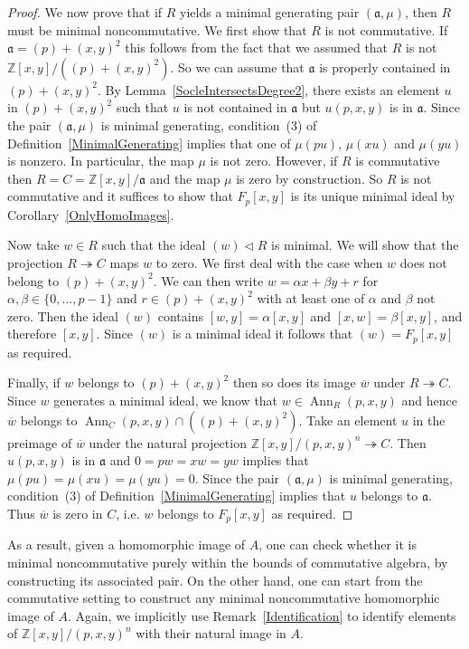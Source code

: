 \documentclass[11pt]{article}
\DeclareMathOperator{\Ann}{Ann}
\theoremstyle{definition}
\begin{document}
\begin{proof}
We now prove that if $R$ yields a minimal generating pair $(\mathfrak{a},\mu)$, then $R$ must be minimal noncommutative. We first show that $R$ is not commutative. If $\mathfrak{a}=(p)+(x,y)^2$ this follows from the fact that we assumed that $R$ is not $\mathbb{Z}[x,y]/\left((p)+(x,y)^2\right)$. So we can assume that $\mathfrak{a}$ is properly contained in $(p)+(x,y)^2$. By Lemma~\ref{SocleIntersectsDegree2}, there exists an element $u$ in $(p)+(x,y)^2$ such that $u$ is not contained in $\mathfrak{a}$ but $u(p,x,y)$ is in $\mathfrak{a}$. Since the pair $\left(\mathfrak{a},\mu\right)$ is minimal generating, condition~(3) of Definition~\ref{MinimalGenerating} implies that one of $\mu(pu)$, $\mu(xu)$ and $\mu(yu)$ is nonzero. In particular, the map $\mu$ is not zero. However, if $R$ is commutative then $R=C=\mathbb{Z}[x,y]/\mathfrak{a}$ and the map $\mu$ is zero by construction. So $R$ is not commutative and it suffices to show that $F_p[x,y]$ is its unique minimal ideal by Corollary~\ref{OnlyHomoImages}.

Now take $w\in R$ such that the ideal $(w)\lhd R$ is minimal. We will show that the projection $R \twoheadrightarrow C$ maps $w$ to zero. We first deal with the case when $w$ does not belong to $(p)+(x,y)^2$. We can then write $w=\alpha x+\beta y + r$ for $\alpha,\beta\in\lbrace 0,\ldots,p-1\rbrace$ and $r\in (p)+(x,y)^2$ with at least one of $\alpha$ and $\beta$ not zero. Then the ideal $(w)$ contains $[w,y]=\alpha[x,y]$ and $[x,w]=\beta[x,y]$, and therefore $[x,y]$. Since $(w)$ is a minimal ideal it follows that $(w)=F_p[x,y]$ as required.

Finally, if $w$ belongs to $(p)+(x,y)^2$ then so does its image $\overline{w}$ under $R\twoheadrightarrow C$. Since $w$ generates a minimal ideal, we know that $w\in\Ann_R(p,x,y)$ and hence $\overline{w}$ belongs to $\Ann_C(p,x,y)\cap\left((p)+(x,y)^2\right)$. Take an element $u$ in the preimage of $\overline{w}$ under the natural projection $\mathbb{Z}[x,y]/(p,x,y)^n\twoheadrightarrow C$. Then $u(p,x,y)$ is in $\mathfrak{a}$ and $0=pw=xw=yw$ implies that $\mu(pu)=\mu(xu)=\mu(yu)=0$. Since the pair $\left(\mathfrak{a},\mu\right)$ is minimal generating, condition~(3) of Definition~\ref{MinimalGenerating} implies that $u$ belongs to $\mathfrak{a}$. Thus $\overline{w}$ is zero in $C$, i.e. $w$ belongs to $F_p[x,y]$ as required.
\end{proof}

As a result, given a homomorphic image of $A$, one can check whether it is minimal noncommutative purely within the bounds of commutative algebra, by constructing its associated pair. On the other hand, one can start from the commutative setting to construct any minimal noncommutative homomorphic image of $A$. Again, we implicitly use Remark~\ref{Identification} to identify elements of $\mathbb{Z}[x,y]/(p,x,y)^n$ with their natural image in $A$.
\end{document}
